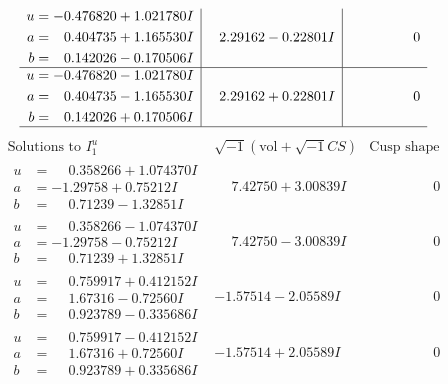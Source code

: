 \documentclass[1p]{elsarticle_modified}
\theoremstyle{definition}
\newcommand{\I}{\sqrt{-1}}
\begin{document}
$$\begin{array}{c|c|c}
\begin{aligned}
u &= -0.476820 + 1.021780 I \\
a &= \phantom{-}0.404735 + 1.165530 I \\
b &= \phantom{-}0.142026 - 0.170506 I\end{aligned}
 & \phantom{-}2.29162 - 0.22801 I & \phantom{-0.000000 } 0 \\ \hline\begin{aligned}
u &= -0.476820 - 1.021780 I \\
a &= \phantom{-}0.404735 - 1.165530 I \\
b &= \phantom{-}0.142026 + 0.170506 I\end{aligned}
 & \phantom{-}2.29162 + 0.22801 I & \phantom{-0.000000 } 0\\
 \hline 
 \end{array}$$\newpage$$\begin{array}{c|c|c}  
\text{Solutions to }I^u_{1}& \I (\text{vol} + \sqrt{-1}CS) & \text{Cusp shape}\\
 \hline 
\begin{aligned}
u &= \phantom{-}0.358266 + 1.074370 I \\
a &= -1.29758 + 0.75212 I \\
b &= \phantom{-}0.71239 - 1.32851 I\end{aligned}
 & \phantom{-}7.42750 + 3.00839 I & \phantom{-0.000000 } 0 \\ \hline\begin{aligned}
u &= \phantom{-}0.358266 - 1.074370 I \\
a &= -1.29758 - 0.75212 I \\
b &= \phantom{-}0.71239 + 1.32851 I\end{aligned}
 & \phantom{-}7.42750 - 3.00839 I & \phantom{-0.000000 } 0 \\ \hline\begin{aligned}
u &= \phantom{-}0.759917 + 0.412152 I \\
a &= \phantom{-}1.67316 - 0.72560 I \\
b &= \phantom{-}0.923789 - 0.335686 I\end{aligned}
 & -1.57514 - 2.05589 I & \phantom{-0.000000 } 0 \\ \hline\begin{aligned}
u &= \phantom{-}0.759917 - 0.412152 I \\
a &= \phantom{-}1.67316 + 0.72560 I \\
b &= \phantom{-}0.923789 + 0.335686 I\end{aligned}
 & -1.57514 + 2.05589 I & \phantom{-0.000000 } 0 \\ \hline\begin{aligned}

\end{aligned}
\end{array}$$
\end{document}
